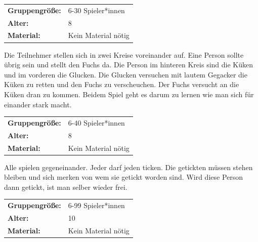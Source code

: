 \begin{table}[H]
\begin{tabular}{>{\bfseries}lp{8cm}}
   Gruppengröße:   & 6-30 Spieler*innen\\
    Alter: & 8 \\
    Material: & Kein Material nötig \\ 
\end{tabular}
\end{table} 
Die Teilnehmer stellen sich in zwei Kreise voreinander auf. Eine Person sollte übrig sein und stellt den Fuchs da. Die Person im hinteren Kreis sind die Küken und im vorderen die Glucken. Die Glucken versuchen mit lautem Gegacker die Küken zu retten und den Fuchs zu verscheuchen. Der Fuchs versucht an die Küken dran zu kommen. Beidem Spiel geht es darum zu lernen wie man sich für einander stark macht. 
 \\



\begin{table}[H]
\begin{tabular}{>{\bfseries}lp{8cm}}
   Gruppengröße:   & 6-40 Spieler*innen\\
    Alter: & 8 \\
    Material: & Kein Material nötig  \\
\end{tabular}
\end{table} 

 Alle spielen gegeneinander. Jeder darf jeden ticken. Die getickten müssen stehen bleiben und sich merken von wem sie getickt worden sind.  Wird diese Person dann getickt, ist man selber wieder frei. \\


\begin{table}[H]
\begin{tabular}{>{\bfseries}lp{8cm}}
   Gruppengröße:   & 6-99 Spieler*innen\\
    Alter: & 10 \\
    Material: & Kein Material nötig \\
\end{tabular}
\end{table} 

